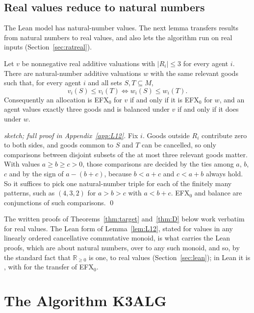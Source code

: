 \documentclass[runningheads,11pt]{llncs}
\newcommand{\efxz}{\texorpdfstring{\mbox{EFX$_0$}}{EFX0}}
\begin{document}
\subsection{Real values reduce to natural numbers}\label{sec:L12}

The Lean model has natural-number values. The next lemma transfers results from natural numbers to real values, and also lets the algorithm run on real inputs (Section~\ref{sec:ratreal}).

\begin{lemma}\label{lem:L12}
Let $v$ be nonnegative real additive valuations with $|R_i|\le3$ for every agent $i$. There are natural-number additive valuations $w$ with the same relevant goods such that, for every agent $i$ and all sets $S,T\subseteq M$,
\[
  v_i(S)\le v_i(T)\iff w_i(S)\le w_i(T).
\]
Consequently an allocation is \efxz{} for $v$ if and only if it is \efxz{} for $w$, and an agent values exactly three goods and is balanced under $v$ if and only if it does under $w$.
\end{lemma}

\begin{proof}[sketch; full proof in Appendix~\ref{app:L12}]
Fix $i$. Goods outside $R_i$ contribute zero to both sides, and goods common to $S$ and $T$ can be cancelled, so only comparisons between disjoint subsets of the at most three relevant goods matter. With values $a\ge b\ge c>0$, those comparisons are decided by the ties among $a$, $b$, $c$ and by the sign of $a-(b+c)$, because $b<a+c$ and $c<a+b$ always hold. So it suffices to pick one natural-number triple for each of the finitely many patterns, such as $(4,3,2)$ for $a>b>c$ with $a<b+c$. \efxz{} and balance are conjunctions of such comparisons. \qed
\end{proof}

\noindent The written proofs of Theorems~\ref{thm:target} and~\ref{thm:D} below work verbatim for real values. The Lean form of Lemma~\ref{lem:L12}, stated for values in any linearly ordered cancellative commutative monoid, is what carries the Lean proofs, which are about natural numbers, over to any such monoid, and so, by the standard fact that $\mathbb{R}_{\ge0}$ is one, to real values (Section~\ref{sec:lean}); in Lean it is , with  for the transfer of \efxz{}.

\section{The Algorithm K3ALG}\label{sec:algo}
\end{document}
